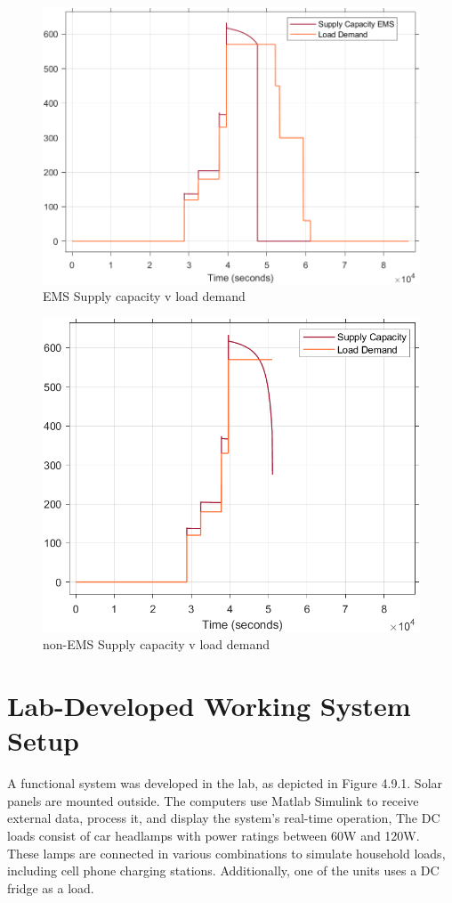 \begin{figure}[H]
	\centering
	\includegraphics[totalheight=8cm]{Figures/ems supply capacity v load demand4.png}
	\caption{EMS Supply capacity v load demand}
\end{figure}
\begin{figure}[H]
	\centering
	\includegraphics[totalheight=8cm]{Figures/non-ems supply capacity v load demand5.png}
	\caption{non-EMS Supply capacity v load demand}
\end{figure}
\section{Lab-Developed Working System Setup}
A functional system was developed in the lab, as depicted in Figure 4.9.1. Solar panels are mounted outside. The computers use Matlab Simulink to receive external data, process it, and display the system's real-time operation, The DC loads consist of car headlamps with power ratings between 60W and 120W. These lamps are connected in various combinations to simulate household loads, including cell phone charging stations. Additionally, one of the units uses a DC fridge as a load.

